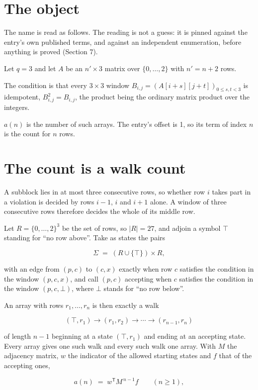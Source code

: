 \documentclass[11pt]{article}
\theoremstyle{definition}
\begin{document}
\section{The object}

The name is read as follows. The reading is not a guess: it is pinned against the entry's own published terms, and against an independent enumeration, before anything is proved (Section 7).

Let $q = 3$ and let $A$ be an $n' \times 3$ matrix over $\{0,\dots,2\}$ with $n' = n + 2$ rows.

The condition is that every $3 \times 3$ window $B_{i,j} = (A[i{+}s][j{+}t])_{0 \le s,t < 3}$ is idempotent, $B_{i,j}^2 = B_{i,j}$, the product being the ordinary matrix product over the integers.

$a(n)$ is the number of such arrays. The entry's offset is 1, so its term of index $n$ is the count for $n$ rows.

\section{The count is a walk count}

A subblock lies in at most three consecutive rows, so whether row $i$ takes part in a violation is decided by rows $i-1$, $i$ and $i+1$ alone. A window of three consecutive rows therefore decides the whole of its middle row.

Let $R = \{0,\dots,2\}^{3}$ be the set of rows, so $|R| = 27$, and adjoin a symbol $\top$ standing for ``no row above''. Take as states the pairs

\[\Sigma \;=\; (R \cup \{\top\}) \times R,\]

with an edge from $(p,c)$ to $(c,x)$ exactly when row $c$ satisfies the condition in the window $(p,c,x)$, and call $(p,c)$ accepting when $c$ satisfies the condition in the window $(p,c,\bot)$, where $\bot$ stands for ``no row below''.

An array with rows $r_1,\dots,r_n$ is then exactly a walk

\[(\top,r_1) \to (r_1,r_2) \to \cdots \to (r_{n-1},r_n)\]

of length $n-1$ beginning at a state $(\top,r_1)$ and ending at an accepting state. Every array gives one such walk and every such walk one array. With $M$ the adjacency matrix, $w$ the indicator of the allowed starting states and $f$ that of the accepting ones,

\[a(n) \;=\; w^{\mathsf T} M^{\,n-1} f \qquad (n \ge 1),\]
\end{document}
